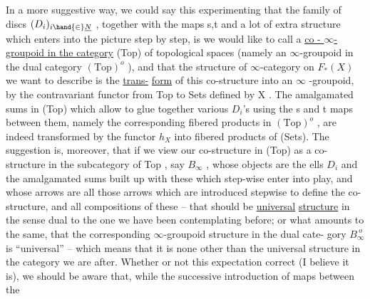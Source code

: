 
In a more suggestive way, we could say  this experimenting that
the family of discs $(D_i)_{i\hand{\in}\underline{N}}$ , together with the maps s,t and a lot of
extra structure which enters into the picture step by step, is  we
would like to call a \uline{co - $\infty$-groupoid in the category} (Top) of topological
spaces (namely an $\infty$-groupoid in the dual category $(\mathrm{Top})^{o}$ ), and that
the structure of $\infty$-category on $F_*(X)$ we want to describe is the \uline{trans-}%
\uline{form} of this co-structure into an $\infty$ -groupoid, by the contravariant
functor from \hand{(}Top\hand{)} to \hand{(}Sets\hand{)} defined by X . The  amalgamated sums in (Top)
which allow to glue together  various $D_i$'s using the s and t maps
between them, namely the corresponding fibered products in $(\mathrm{Top})^{o}$ , are
indeed transformed by the functor $h_X$ into fibered products of (Sets).
The suggestion is, moreover, that if we view our co-structure in (Top)
as a co-structure in the subcategory of Top , say $B_\infty$ , whose objects
are the ells $D_i$ and the amalgamated sums built up with these which
step-wise enter into play, and whose arrows are all those arrows which
are introduced stepwise to define the co-structure, and all compositions
of these -- that  should be   \uline{universal} \uline{structure} in the sense
dual to the one we have been contemplating before; or what amounts to 
the same, that the corresponding $\infty$-groupoid structure in the dual cate-%
gory $B_\infty^{\ o}$ is ``universal'' -- which means  that it is none
other than the universal structure in the category   we are after.
Whether or not this expectation   correct (I believe it is\hand{(!!!)}), we should
be aware that, while the successive introduction of maps between the
